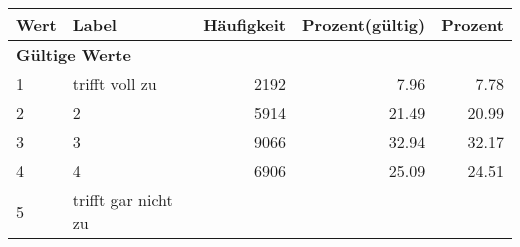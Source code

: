      \begin{longtable}{lXrrr}
     \toprule
     \textbf{Wert} & \textbf{Label} & \textbf{Häufigkeit} & \textbf{Prozent(gültig)} & \textbf{Prozent} \\
     \endhead
     \midrule
     \multicolumn{5}{l}{\textbf{Gültige Werte}}\\

     1 &
     \multicolumn{1}{X}{ trifft voll zu   } &


       \num{2192} &
       \num[round-mode=places,round-precision=2]{7,96} &
         \num[round-mode=places,round-precision=2]{7,78} \\

     2 &
     \multicolumn{1}{X}{ 2   } &


       \num{5914} &
       \num[round-mode=places,round-precision=2]{21,49} &
         \num[round-mode=places,round-precision=2]{20,99} \\

     3 &
     \multicolumn{1}{X}{ 3   } &


       \num{9066} &
       \num[round-mode=places,round-precision=2]{32,94} &
         \num[round-mode=places,round-precision=2]{32,17} \\

     4 &
     \multicolumn{1}{X}{ 4   } &


       \num{6906} &
       \num[round-mode=places,round-precision=2]{25,09} &
         \num[round-mode=places,round-precision=2]{24,51} \\

     5 &
     \multicolumn{1}{X}{ trifft gar nicht zu   } &



\end{longtable}
